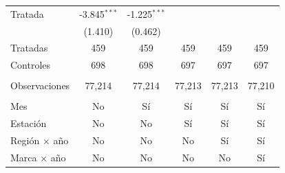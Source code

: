 \begin{tabular}{lccccc}
   Tratada              & -3.845$^{***}$ & -1.225$^{***}$ &                &                &   \\   
                        & (1.410)        & (0.462)        &                &                &   \\   
   Tratadas             & 459            & 459            & 459            & 459            & 459\\  
   Controles            & 698            & 698            & 697            & 697            & 697\\  
    \\
   Observaciones        & 77,214         & 77,214         & 77,213         & 77,213         & 77,210\\  
    \\
   Mes                  & No             & Sí             & Sí             & Sí             & Sí\\  
   Estación             & No             & No             & Sí             & Sí             & Sí\\  
   Región $\times$ año  & No             & No             & No             & Sí             & Sí\\  
   Marca $\times$ año   & No             & No             & No             & No             & Sí\\  
   \bottomrule
\end{tabular}
\par\endgroup


